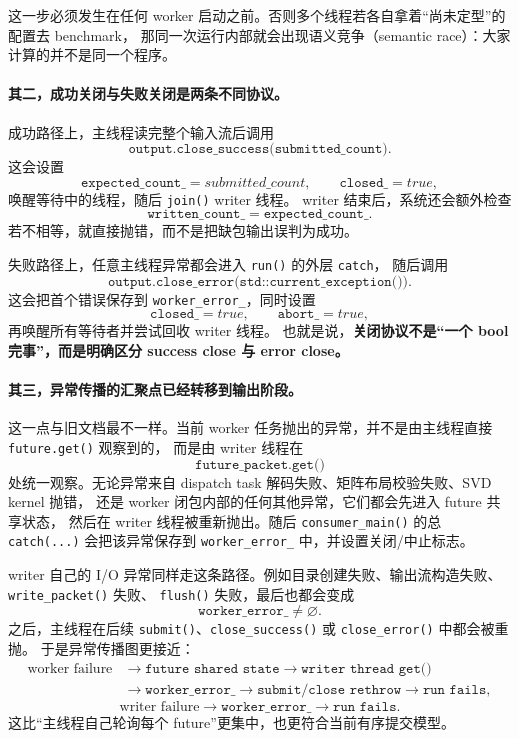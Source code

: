 这一步必须发生在任何 worker 启动之前。否则多个线程若各自拿着“尚未定型”的配置去 benchmark，
那同一次运行内部就会出现语义竞争（semantic race）：大家计算的并不是同一个程序。

\paragraph{其二，成功关闭与失败关闭是两条不同协议。}
成功路径上，主线程读完整个输入流后调用
\[
    \texttt{output.close\_success(submitted\_count)}.
\]
这会设置
\[
    \texttt{expected\_count\_}=submitted\_count,\qquad
    \texttt{closed\_}=true,
\]
唤醒等待中的线程，随后 \texttt{join()} writer 线程。
writer 结束后，系统还会额外检查
\[
    \texttt{written\_count\_}=\texttt{expected\_count\_}.
\]
若不相等，就直接抛错，而不是把缺包输出误判为成功。

失败路径上，任意主线程异常都会进入 \texttt{run()} 的外层 \texttt{catch}，
随后调用
\[
    \texttt{output.close\_error(std::current\_exception())}.
\]
这会把首个错误保存到 \texttt{worker\_error\_}，同时设置
\[
    \texttt{closed\_}=true,\qquad \texttt{abort\_}=true,
\]
再唤醒所有等待者并尝试回收 writer 线程。
也就是说，\textbf{关闭协议不是“一个 bool 完事”，而是明确区分 success close 与 error close。}

\paragraph{其三，异常传播的汇聚点已经转移到输出阶段。}
这一点与旧文档最不一样。当前 worker 任务抛出的异常，并不是由主线程直接 \texttt{future.get()} 观察到的，
而是由 writer 线程在
\[
    \texttt{future\_packet.get()}
\]
处统一观察。无论异常来自 dispatch task 解码失败、矩阵布局校验失败、SVD kernel 抛错，
还是 worker 闭包内部的任何其他异常，它们都会先进入 future 共享状态，
然后在 writer 线程被重新抛出。随后 \texttt{consumer\_main()} 的总 \texttt{catch(...)} 会把该异常保存到
\texttt{worker\_error\_} 中，并设置关闭/中止标志。

writer 自己的 I/O 异常同样走这条路径。例如目录创建失败、输出流构造失败、\texttt{write\_packet()} 失败、
\texttt{flush()} 失败，最后也都会变成
\[
    \texttt{worker\_error\_} \neq \varnothing.
\]
之后，主线程在后续 \texttt{submit()}、\texttt{close\_success()} 或 \texttt{close\_error()} 中都会被重抛。
于是异常传播图更接近：
\[
    \begin{aligned}
        \text{worker failure}
         & \rightarrow
        \texttt{future shared state}
        \rightarrow
        \texttt{writer thread get()} \\
         & \rightarrow
        \texttt{worker\_error\_}
        \rightarrow
        \texttt{submit/close rethrow}
        \rightarrow
        \texttt{run fails},
    \end{aligned}
\]
\[
    \text{writer failure}
    \rightarrow
    \texttt{worker\_error\_}
    \rightarrow
    \texttt{run fails}.
\]
这比“主线程自己轮询每个 future”更集中，也更符合当前有序提交模型。

